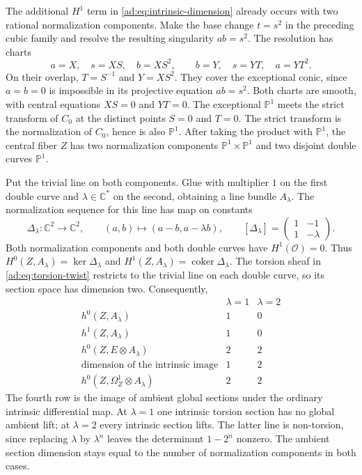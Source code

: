 \documentclass[11pt]{article}
\numberwithin{equation}{section}
\begin{document}
\begin{example}\label{ad:ex:two-component-gluing}
The additional $H^1$ term in \eqref{ad:eq:intrinsic-dimension}
already occurs with two rational normalization components.
Make the base change $t=s^2$ in the preceding cubic family and
resolve the resulting singularity $ab=s^2$.
The resolution has charts
\[
 a=X,\quad s=XS,\quad b=XS^2,
 \qquad
 b=Y,\quad s=YT,\quad a=YT^2.
\]
On their overlap, $T=S^{-1}$ and $Y=XS^2$. They cover the
exceptional conic, since $a=b=0$ is impossible in its projective
equation $ab=s^2$. Both charts are smooth, with central equations
$XS=0$ and $YT=0$.
The exceptional $\mathbb P^1$ meets the strict transform of $C_0$
at the distinct points $S=0$ and $T=0$.
The strict transform is the normalization of $C_0$, hence is also
$\mathbb P^1$. After taking the product with $\mathbb P^1$, the
central fiber $Z$ has two normalization components
$\mathbb P^1\times\mathbb P^1$ and two disjoint double curves
$\mathbb P^1$.

Put the trivial line on both components. Glue with multiplier $1$
on the first double curve and $\lambda\in\mathbb C^*$ on the
second, obtaining a line bundle $A_\lambda$.
The normalization sequence for this line has map on constants
\[
 \Delta_\lambda:\mathbb C^2\longrightarrow\mathbb C^2,
 \qquad
 (a,b)\longmapsto(a-b,a-\lambda b),
 \qquad
 [\Delta_\lambda]=
 \begin{pmatrix}1&-1\\1&-\lambda\end{pmatrix}.
\]
Both normalization components and both double curves have
$H^1(\mathcal O)=0$. Thus
$H^0(Z,A_\lambda)=\ker\Delta_\lambda$ and
$H^1(Z,A_\lambda)=\operatorname{coker}\Delta_\lambda$.
The torsion sheaf in \eqref{ad:eq:torsion-twist} restricts to the
trivial line on each double curve, so its section space has
dimension two. Consequently,
\[
\begin{array}{l|cc}
 &\lambda=1&\lambda=2\\ \hline
 h^0(Z,A_\lambda)&1&0\\
 h^1(Z,A_\lambda)&1&0\\
 h^0(Z,E\otimes A_\lambda)&2&2\\
 \text{dimension of the intrinsic image}&1&2\\
 h^0(Z,\Omega_Z^1\otimes A_\lambda)&2&2
\end{array}
\]
The fourth row is the image of ambient global sections under the
ordinary intrinsic differential map. At $\lambda=1$ one intrinsic
torsion section has no global ambient lift; at $\lambda=2$ every
intrinsic section lifts.
The latter line is non-torsion, since replacing $\lambda$ by
$\lambda^n$ leaves the determinant $1-2^n$ nonzero.
The ambient section dimension stays equal to the number of
normalization components in both cases.
\end{example}
\end{document}
